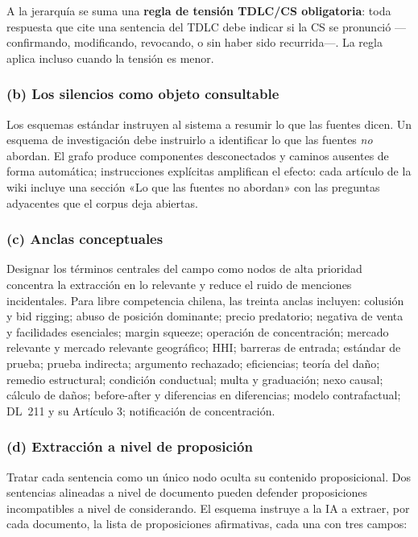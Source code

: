 \documentclass[12pt,a4paper]{article}
\begin{document}
A la jerarquía se suma una \textbf{regla de tensión TDLC/CS obligatoria}: toda
respuesta que cite una sentencia del TDLC debe indicar si la CS se pronunció
—confirmando, modificando, revocando, o sin haber sido recurrida—. La regla
aplica incluso cuando la tensión es menor.

\subsubsection*{(b) Los silencios como objeto consultable}

Los esquemas estándar instruyen al sistema a resumir lo que las fuentes dicen.
Un esquema de investigación debe instruirlo a identificar lo que las fuentes
\emph{no} abordan. El grafo produce componentes desconectados y caminos
ausentes de forma automática; instrucciones explícitas amplifican el efecto:
cada artículo de la wiki incluye una sección «Lo que las fuentes no abordan» con
las preguntas adyacentes que el corpus deja abiertas.

\subsubsection*{(c) Anclas conceptuales}

Designar los términos centrales del campo como nodos de alta prioridad
concentra la extracción en lo relevante y reduce el ruido de menciones
incidentales. Para libre competencia chilena, las treinta anclas incluyen:
colusión y bid rigging; abuso de posición dominante; precio predatorio; negativa
de venta y facilidades esenciales; margin squeeze; operación de concentración;
mercado relevante y mercado relevante geográfico; HHI; barreras de entrada;
estándar de prueba; prueba indirecta; argumento rechazado; eficiencias; teoría
del daño; remedio estructural; condición conductual; multa y graduación; nexo
causal; cálculo de daños; before-after y diferencias en diferencias; modelo
contrafactual; DL~211 y su Artículo 3; notificación de concentración.

\subsubsection*{(d) Extracción a nivel de proposición}

Tratar cada sentencia como un único nodo oculta su contenido proposicional. Dos
sentencias alineadas a nivel de documento pueden defender proposiciones
incompatibles a nivel de considerando. El esquema instruye a la IA a extraer,
por cada documento, la lista de proposiciones afirmativas, cada una con tres
campos:
\end{document}
